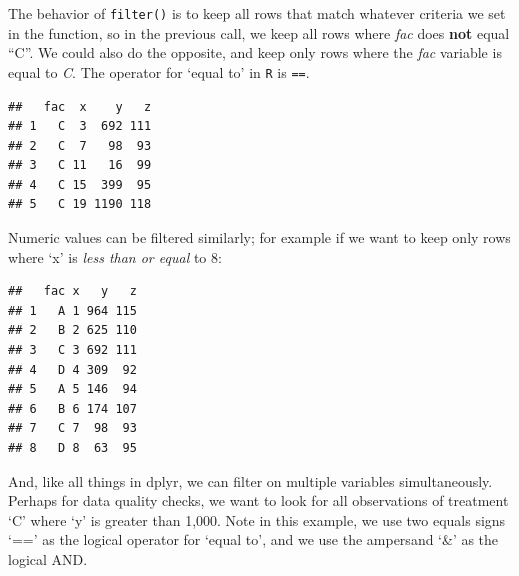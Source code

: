 \documentclass[letterpaper,]{book}
\newenvironment{Shaded}{\begin{snugshade}}{\end{snugshade}}
\newcommand{\DecValTok}[1]{\textcolor[rgb]{0.00,0.00,0.81}{#1}}
\newcommand{\KeywordTok}[1]{\textcolor[rgb]{0.13,0.29,0.53}{\textbf{#1}}}
\newcommand{\NormalTok}[1]{#1}
\newcommand{\OperatorTok}[1]{\textcolor[rgb]{0.81,0.36,0.00}{\textbf{#1}}}
\newcommand{\StringTok}[1]{\textcolor[rgb]{0.31,0.60,0.02}{#1}}
\begin{document}
The behavior of \texttt{filter()} is to keep all rows that match whatever criteria we set in the function, so in the previous call, we keep all rows where \emph{fac} does \textbf{not} equal ``C''. We could also do the opposite, and keep only rows where the \emph{fac} variable is equal to \emph{C}. The operator for `equal to' in \texttt{R} is \texttt{==}.

\begin{Shaded}
\end{Shaded}

\begin{verbatim}
##   fac  x    y   z
## 1   C  3  692 111
## 2   C  7   98  93
## 3   C 11   16  99
## 4   C 15  399  95
## 5   C 19 1190 118
\end{verbatim}

Numeric values can be filtered similarly; for example if we want to keep only rows where `x' is \emph{less than or equal} to 8:

\begin{Shaded}
\end{Shaded}

\begin{verbatim}
##   fac x   y   z
## 1   A 1 964 115
## 2   B 2 625 110
## 3   C 3 692 111
## 4   D 4 309  92
## 5   A 5 146  94
## 6   B 6 174 107
## 7   C 7  98  93
## 8   D 8  63  95
\end{verbatim}

And, like all things in dplyr, we can filter on multiple variables simultaneously. Perhaps for data quality checks, we want to look for all observations of treatment `C' where `y' is greater than 1,000. Note in this example, we use two equals signs `==' as the logical operator for `equal to', and we use the ampersand `\&' as the logical AND.

\begin{Shaded}
\end{Shaded}
\end{document}
